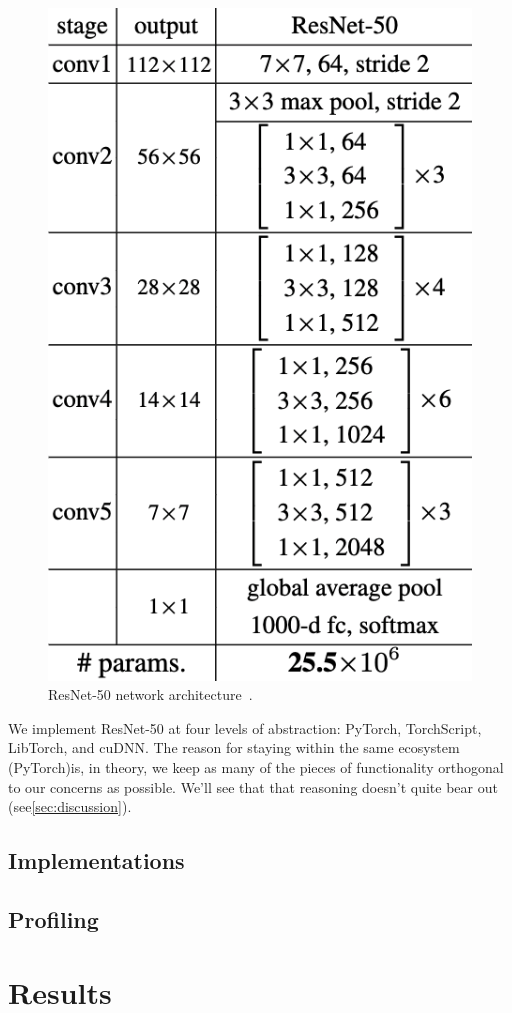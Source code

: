 \documentclass[sigconf]{acmart}
\begin{document}
\begin{figure}
  \includegraphics[width=.7\linewidth]{figures/resnet50.png}
  \caption{ResNet-50 network architecture~\cite{he2015deep}.}
  \label{fig:resnet}
\end{figure}

We implement ResNet-50 at four levels of abstraction: PyTorch, TorchScript, LibTorch, and cuDNN.
The reason for staying within the same ecosystem (PyTorch)is, in theory, we keep as many of the pieces of functionality orthogonal to our concerns as possible.
We'll see that that reasoning doesn't quite bear out (see\ref{sec:discussion}).

\subsection{Implementations}\label{subsec:implementations}

\subsection{Profiling}\label{subsec:profiling}

\section{Results}\label{sec:results}
\end{document}
